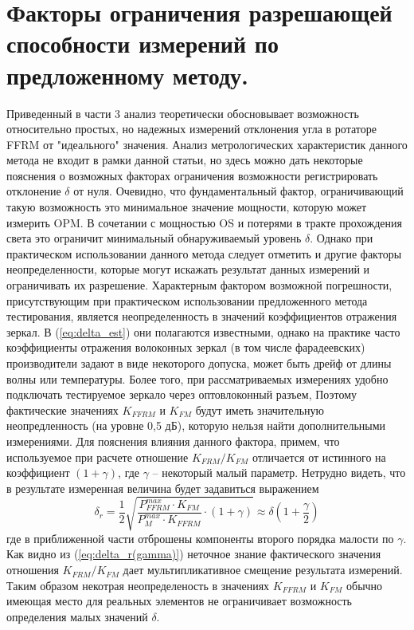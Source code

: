 \documentclass{article}
\begin{document}
\section{Факторы ограничения разрешающей способности измерений по предложенному методу.}

Приведенный в части 3 анализ теоретически обосновывает возможность относительно простых, но надежных измерений отклонения угла в ротаторе FFRM от "идеального" значения.
Анализ метрологических характеристик данного метода не входит в рамки данной статьи, но здесь можно дать некоторые пояснения 
о возможных факторах ограничения возможности регистрировать отклонение $\delta $ от нуля. Очевидно, что фундаментальный фактор, ограничивающий такую возможность это минимальное значение мощности, которую может измерить OPM. В сочетании с мощностью OS и потерями в тракте прохождения света это ограничит минимальный обнаруживаемый уровень $\delta $.
Однако при практическом использовании данного метода следует отметить и другие факторы неопределенности, которые могут искажать результат данных измерений и ограничивать их разрешение.   
Характерным фактором возможной погрешности, присутствующим при практическом использовании предложенного метода тестирования, является неопределенность в значений коэффициентов отражения зеркал. В (\ref{eq:delta_est}) они полагаются известными, однако на практике часто коэффициенты отражения волоконных зеркал (в том числе фарадеевских) производители задают в виде некоторого допуска, может быть дрейф от длины волны или температуры. Более того, при рассматриваемых измерениях удобно подключать тестируемое зеркало через оптовлоконный разъем, Поэтому фактические значениях $K_{FFRM}$ и $K_{FM}$ будут иметь значительную неопредленность (на уровне 0,5 дБ), которую нельзя найти дополнительными измерениями. Для пояснения влияния данного фактора, примем, что используемое при расчете отношение $K_{FRM}/K_{FM}$ отличается от истинного на коэффициент $(1 + \gamma)$, где $\gamma$ – некоторый малый параметр. Нетрудно видеть, что в результате измеренная величина будет задавиться выражением   
\begin{equation}
    \label{eq:delta_r(gamma)}
    \delta_r =\frac{1}{2}\sqrt{\frac{P_{FFRM}^{max}\cdot K_{FM}}{P_M^{max}\cdot K_{FFRM}}\cdot(1+\gamma)}\approx \delta\left(1+\frac{\gamma}{2}\right)
\end{equation}
где в приближенной части отброшены компоненты второго порядка малости по $\gamma$.
Как видно из (\ref{eq:delta_r(gamma)}) неточное знание фактического значения отношения $K_{FRM}/K_{FM}$ дает мультипликативное смещение результата измерений. Таким образом некотрая неопределеность в значениях $K_{FFRM}$ и $K_{FM}$ обычно имеющая место для реальных элементов не ограничивает возможность определения малых значений  $\delta $.  
\end{document}
